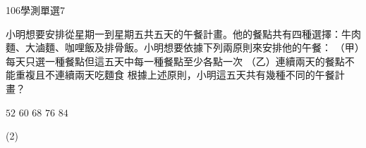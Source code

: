 \begin{QUESTIONS}
\begin{QUESTION}
\begin{QSOLLIST}
\begin{QOP}
\begin{QSTEPS}
                \end{QSTEPS}
            \end{QOP}
        \end{QSOLLIST}
        \begin{QEMPTYSPACE}
        \end{QEMPTYSPACE}
    \end{QUESTION}
    \begin{QUESTION}
        \begin{ExamInfo}{106}{學測}{單選}{7}
        \end{ExamInfo}
        \begin{ExamAnsRateInfo}{29}{40}{27}{20}
        \end{ExamAnsRateInfo}
        \begin{QBODY}
            小明想要安排從星期一到星期五共五天的午餐計畫。他的餐點共有四種選擇：牛肉麵、大滷麵、咖哩飯及排骨飯。小明想要依據下列兩原則來安排他的午餐：
			（甲）每天只選一種餐點但這五天中每一種餐點至少各點一次
			（乙）連續兩天的餐點不能重複且不連續兩天吃麵食
			根據上述原則，小明這五天共有幾種不同的午餐計畫？
			\begin{QOPS}
				\QOP $52$      
				\QOP $60$      
				\QOP $68$      
				\QOP $76$      
				\QOP $84$
			\end{QOPS}
        \end{QBODY}
        \begin{QFROMS}
        \end{QFROMS}
        \begin{QTAGS}\end{QTAGS}
        \begin{QANS}
            (2)
        \end{QANS}
        \begin{QSOLLIST}
            \begin{QSOL}
                \begin{QSTEPS}
\end{QSTEPS}
\end{QSOL}
\end{QSOLLIST}
\end{QUESTION}
\end{QUESTIONS}
